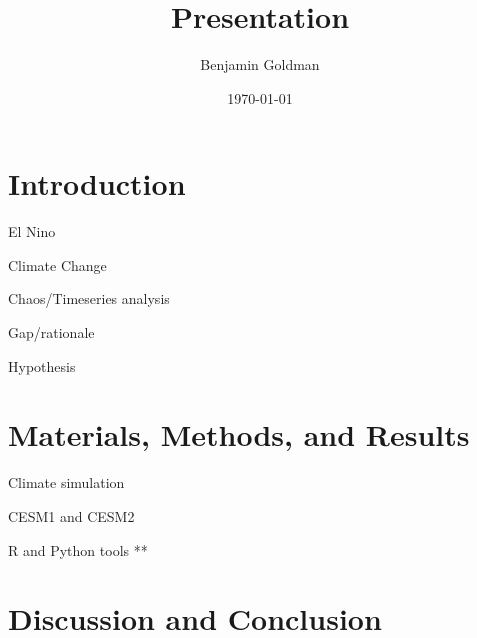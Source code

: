 \documentclass[presentation]{beamer}
\author{Benjamin Goldman}
\date{\today}
\title{Presentation}
\begin{document}
\maketitle

\section{Introduction}
\label{sec:orgc44fc10}

\begin{frame}[label={sec:orgf174f87}]{El Nino}
\end{frame}
\begin{frame}[label={sec:orgbb4e216}]{Climate Change}
\end{frame}
\begin{frame}[label={sec:org9a7241e}]{Chaos/Timeseries analysis}
\end{frame}
\begin{frame}[label={sec:org0558743}]{Gap/rationale}
\end{frame}
\begin{frame}[label={sec:orgaa26d89}]{Hypothesis}
\end{frame}

\section{Materials, Methods, and Results}
\label{sec:org45d9343}
\begin{frame}[label={sec:orgfdd47ac}]{Climate simulation}
\end{frame}
\begin{frame}[label={sec:org59b9f58}]{CESM1 and CESM2}
\end{frame}
\begin{frame}[label={sec:org8e1af0f}]{R and Python tools}
**
\end{frame}

\section{Discussion and Conclusion}
\label{sec:orgc16fbba}
\end{document}

